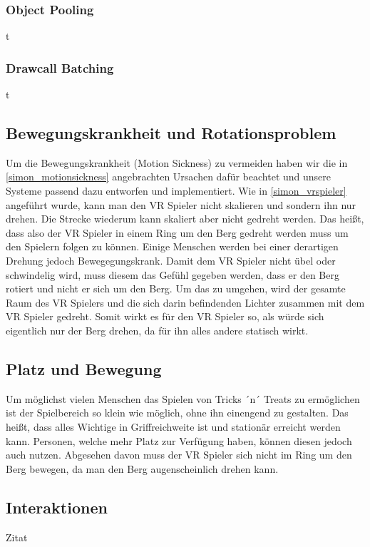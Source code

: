 \subsubsection{Object Pooling}
t

\subsubsection{Drawcall Batching}
t

\subsection{Bewegungskrankheit und Rotationsproblem}
Um die Bewegungskrankheit (Motion Sickness) zu vermeiden haben wir die in \ref{simon_motionsickness} angebrachten Ursachen dafür beachtet und unsere Systeme passend dazu entworfen und implementiert.
Wie in \ref{simon_vrspieler} angeführt wurde, kann man den VR Spieler nicht skalieren und sondern ihn nur drehen. Die Strecke wiederum kann skaliert aber nicht gedreht werden. Das heißt, dass also der VR Spieler in einem Ring um den Berg gedreht werden muss um den Spielern folgen zu können. Einige Menschen werden bei einer derartigen Drehung jedoch Bewegegungskrank. Damit dem VR Spieler nicht übel oder schwindelig wird, muss diesem das Gefühl gegeben werden, dass er den Berg rotiert und nicht er sich um den Berg. Um das zu umgehen, wird der gesamte Raum des VR Spielers und die sich darin befindenden Lichter zusammen mit dem VR Spieler gedreht. Somit wirkt es für den VR Spieler so, als würde sich eigentlich nur der Berg drehen, da für ihn alles andere statisch wirkt.

\subsection{Platz und Bewegung}
Um möglichst vielen Menschen das Spielen von Tricks ´n´ Treats zu ermöglichen ist der Spielbereich so klein wie möglich, ohne ihn einengend zu gestalten. Das heißt, dass alles Wichtige in Griffreichweite ist und stationär erreicht werden kann. Personen, welche mehr Platz zur Verfügung haben, können diesen jedoch auch nutzen. Abgesehen davon muss der VR Spieler sich nicht im Ring um den Berg bewegen, da man den Berg augenscheinlich drehen kann.

\subsection{Interaktionen}
Zitat